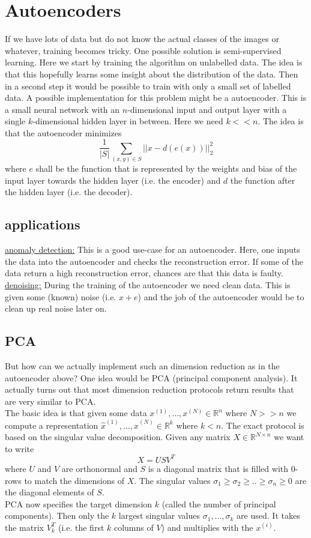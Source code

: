 \documentclass[a4paper, 12pt]{article}
\theoremstyle{plain}
\theoremstyle{definition}
\theoremstyle{lemma}
\theoremstyle{remark}
\theoremstyle{example}
\begin{document}
	\section{Autoencoders}
	If we have lots of data but do not know the actual classes of the images or whatever, training becomes tricky. One possible solution is semi-supervised learning. Here we start by training the algorithm on unlabelled data. The idea is that this hopefully learns some insight about the distribution of the data. Then in a second step it would be possible to train with only a small set of labelled data. A possible implementation for this problem might be a autoencoder. This is a small neural network with an $n$-dimensional input and output layer with a single $k$-dimensional hidden layer in between. Here we need $k << n$. The idea is that the autoencoder minimizes \[\frac{1}{\left|S\right|} \sum_{(x,y) \in S} ||x-d(e(x))||_2^2\] where $e$ shall be the function that is represented by the weights and bias of the input layer towards the hidden layer (i.e. the encoder) and $d$ the function after the hidden layer (i.e. the decoder). 
	\subsection{applications}
	\underline{anomaly detection:} This is a good use-case for an autoencoder. Here, one inputs the data into the autoencoder and checks the reconstruction error. If some of the data return a high reconstruction error, chances are that this data is faulty.\\
	\underline{denoising:} During the training of the autoencoder we need clean data. This is given some (known) noise (i.e. $x+e$) and the job of the autoencoder would be to clean up real noise later on.
	\subsection{PCA}
	But how can we actually implement such an dimension reduction as in the autoencoder above? One idea would be PCA (principal component analysis). It actually turns out that most dimension reduction protocols return results that are very similar to PCA.\\
	The basic idea is that given some data $x^{(1)},...,x^{(N)} \in \mathbb{R}^n$ where $N>>n$ we compute a representation $\hat{x}^{(1)}, ..., \hat{x}^{(N)} \in \mathbb{R}^k$ where $k<n$. The exact protocol is based on the singular value decomposition. Given any matrix $X \in \mathbb{R}^{N \times n}$ we want to write \[X = USV^T\] where $U$ and $V$ are orthonormal and $S$ is a diagonal matrix that is filled with 0-rows to match the dimensions of $X$. The singular values $\sigma_1 \geq \sigma_2 \geq .. \geq \sigma_n \geq 0$ are the diagonal elements of $S$.\\
	PCA now specifies the target dimension $k$ (called the number of principal components). Then only the $k$ largest singular values $\sigma_1, ..., \sigma_k$ are used. It takes the matrix $V_k^T$ (i.e. the first $k$ columns of $V$) and multiplies with the $x^{(i)}$. 
\end{document}
